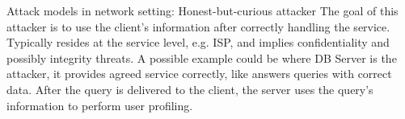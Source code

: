 Attack models in network setting: Honest-but-curious attacker
The goal of this attacker is to use the client’s information after correctly handling the service. Typically resides at the service level, e.g. ISP,  and implies confidentiality and possibly integrity threats.
A possible example could be where DB Server is the attacker, it provides agreed service
correctly, like answers queries with correct data. After the query is delivered to the client, the server uses the query’s information to perform user profiling.


